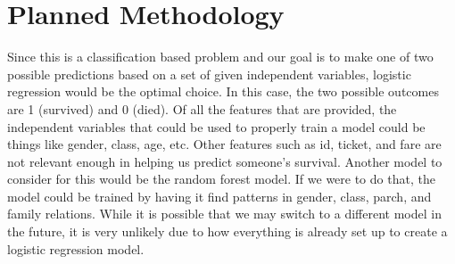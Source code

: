 \documentclass{APA}
\begin{document}
\section{Planned Methodology}
Since this is a classification based problem and our goal is to make one of two possible predictions based on a set of given independent variables, logistic regression would be the optimal choice. In this case, the two possible outcomes are 1 (survived) and 0 (died). Of all the features that are provided, the independent variables that could be used to properly train a model could be things like gender, class, age, etc. Other features such as id, ticket, and fare are not relevant enough in helping us predict someone’s survival. Another model to consider for this would be the random forest model. If we were to do that, the model could be trained by having it find patterns in gender, class, parch, and family relations. While it is possible that we may switch to a different model in the future, it is very unlikely due to how everything is already set up to create a logistic regression model.
\newpage
\end{document}
